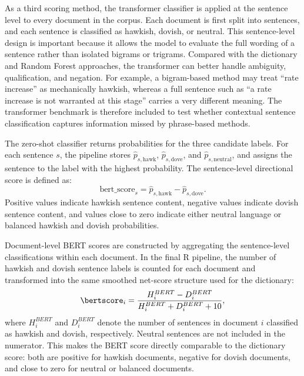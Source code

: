 As a third scoring method, the transformer classifier is applied at the
sentence level to every document in the corpus. Each document is first
split into sentences, and each sentence is classified as hawkish,
dovish, or neutral. This sentence-level design is important because it
allows the model to evaluate the full wording of a sentence rather than
isolated bigrams or trigrams. Compared with the dictionary and Random
Forest approaches, the transformer can better handle ambiguity,
qualification, and negation. For example, a bigram-based method may treat
``rate increase'' as mechanically hawkish, whereas a full sentence such
as ``a rate increase is not warranted at this stage'' carries a very
different meaning. The transformer benchmark is therefore included to
test whether contextual sentence classification captures information
missed by phrase-based methods.

The zero-shot classifier returns probabilities for the three candidate
labels. For each sentence \(s\), the pipeline stores
\(\hat{p}_{s,\text{hawk}}\), \(\hat{p}_{s,\text{dove}}\), and
\(\hat{p}_{s,\text{neutral}}\), and assigns the sentence to the label
with the highest probability. The sentence-level directional score is
defined as:
%
\begin{equation}
\label{eq:bert_sentence_score}
\text{bert\_score}_{s}
=
\hat{p}_{s,\text{hawk}}
-
\hat{p}_{s,\text{dove}}.
\end{equation}
%
Positive values indicate hawkish sentence content, negative values
indicate dovish sentence content, and values close to zero indicate
either neutral language or balanced hawkish and dovish probabilities.

Document-level BERT scores are constructed by aggregating the
sentence-level classifications within each document. In the final R
pipeline, the number of hawkish and dovish sentence labels is counted for
each document and transformed into the same smoothed net-score structure
used for the dictionary:
%
\begin{equation}
\label{eq:bert_doc_score}
\bertscore_i
=
\frac{H^{BERT}_i - D^{BERT}_i}
     {H^{BERT}_i + D^{BERT}_i + 10},
\end{equation}
%
where \(H^{BERT}_i\) and \(D^{BERT}_i\) denote the number of sentences in
document \(i\) classified as hawkish and dovish, respectively. Neutral
sentences are not included in the numerator. This makes the BERT score
directly comparable to the dictionary score: both are positive for
hawkish documents, negative for dovish documents, and close to zero for
neutral or balanced documents.

